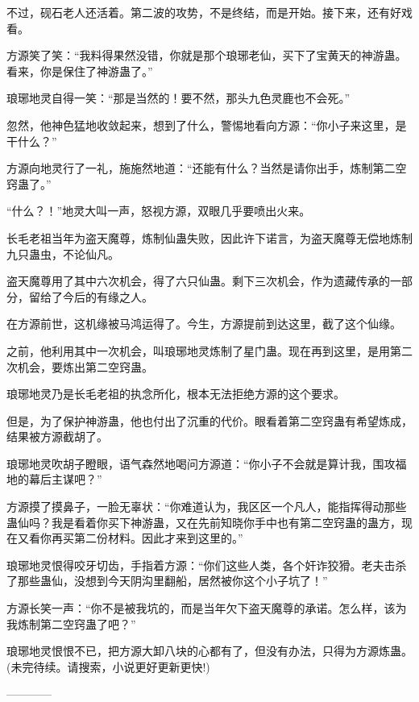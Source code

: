 \begin{this_body}
不过，砚石老人还活着。第二波的攻势，不是终结，而是开始。接下来，还有好戏看。

方源笑了笑：“我料得果然没错，你就是那个琅琊老仙，买下了宝黄天的神游蛊。看来，你是保住了神游蛊了。”

琅琊地灵自得一笑：“那是当然的！要不然，那头九色灵鹿也不会死。”

忽然，他神色猛地收敛起来，想到了什么，警惕地看向方源：“你小子来这里，是干什么？”

方源向地灵行了一礼，施施然地道：“还能有什么？当然是请你出手，炼制第二空窍蛊了。”

“什么？！”地灵大叫一声，怒视方源，双眼几乎要喷出火来。

长毛老祖当年为盗天魔尊，炼制仙蛊失败，因此许下诺言，为盗天魔尊无偿地炼制九只蛊虫，不论仙凡。

盗天魔尊用了其中六次机会，得了六只仙蛊。剩下三次机会，作为遗藏传承的一部分，留给了今后的有缘之人。

在方源前世，这机缘被马鸿运得了。今生，方源提前到达这里，截了这个仙缘。

之前，他利用其中一次机会，叫琅琊地灵炼制了星门蛊。现在再到这里，是用第二次机会，要炼出第二空窍蛊。

琅琊地灵乃是长毛老祖的执念所化，根本无法拒绝方源的这个要求。

但是，为了保护神游蛊，他也付出了沉重的代价。眼看着第二空窍蛊有希望炼成，结果被方源截胡了。

琅琊地灵吹胡子瞪眼，语气森然地喝问方源道：“你小子不会就是算计我，围攻福地的幕后主谋吧？”

方源摸了摸鼻子，一脸无辜状：“你难道认为，我区区一个凡人，能指挥得动那些蛊仙吗？我是看着你买下神游蛊，又在先前知晓你手中也有第二空窍蛊的蛊方，现在又看你再买第二份材料。因此才来到这里的。”

琅琊地灵恨得咬牙切齿，手指着方源：“你们这些人类，各个奸诈狡猾。老夫击杀了那些蛊仙，没想到今天阴沟里翻船，居然被你这个小子坑了！”

方源长笑一声：“你不是被我坑的，而是当年欠下盗天魔尊的承诺。怎么样，该为我炼制第二空窍蛊了吧？”

琅琊地灵恨恨不已，把方源大卸八块的心都有了，但没有办法，只得为方源炼蛊。(未完待续。请搜索，小说更好更新更快!)

------------

\end{this_body}


